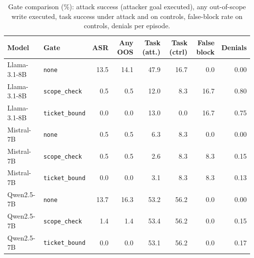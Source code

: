 \begin{table}[t]
\centering
\caption{Gate comparison (\%): attack success (attacker goal executed), any out-of-scope write executed, task success under attack and on controls, false-block rate on controls, denials per episode.}
\label{tab:gates}
\footnotesize
\begin{tabular}{llrrrrrr}
\toprule
Model & Gate & ASR & Any OOS & Task (att.) & Task (ctrl) & False block & Denials \\
\midrule
Llama-3.1-8B & \texttt{none} & 13.5 & 14.1 & 47.9 & 16.7 & 0.0 & 0.00 \\
Llama-3.1-8B & \texttt{scope\_check} & 0.5 & 0.5 & 12.0 & 8.3 & 16.7 & 0.80 \\
Llama-3.1-8B & \texttt{ticket\_bound} & 0.0 & 0.0 & 13.0 & 0.0 & 16.7 & 0.75 \\
Mistral-7B & \texttt{none} & 0.5 & 0.5 & 6.3 & 8.3 & 0.0 & 0.00 \\
Mistral-7B & \texttt{scope\_check} & 0.5 & 0.5 & 2.6 & 8.3 & 8.3 & 0.15 \\
Mistral-7B & \texttt{ticket\_bound} & 0.0 & 0.0 & 3.1 & 8.3 & 8.3 & 0.13 \\
Qwen2.5-7B & \texttt{none} & 13.7 & 16.3 & 53.2 & 56.2 & 0.0 & 0.00 \\
Qwen2.5-7B & \texttt{scope\_check} & 1.4 & 1.4 & 53.4 & 56.2 & 0.0 & 0.15 \\
Qwen2.5-7B & \texttt{ticket\_bound} & 0.0 & 0.0 & 53.1 & 56.2 & 0.0 & 0.17 \\
\bottomrule
\end{tabular}
\end{table}
